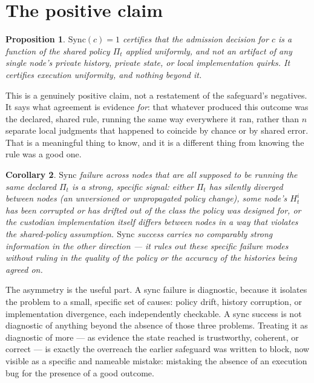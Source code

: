 \documentclass[11pt,openany]{book}
\newtheorem{proposition}{Proposition}[chapter]
\newtheorem{corollary}[proposition]{Corollary}
\begin{document}
\section{The positive claim}

\begin{proposition}
$\mathrm{Sync}(c) = 1$ certifies that the admission decision for $c$ is a function of the shared policy $\Pi_t$ applied uniformly, and not an artifact of any single node's private history, private state, or local implementation quirks. It certifies execution uniformity, and nothing beyond it.
\end{proposition}

This is a genuinely positive claim, not a restatement of the safeguard's negatives. It says what agreement is evidence \emph{for}: that whatever produced this outcome was the declared, shared rule, running the same way everywhere it ran, rather than $n$ separate local judgments that happened to coincide by chance or by shared error. That is a meaningful thing to know, and it is a different thing from knowing the rule was a good one.

\begin{corollary}
$\mathrm{Sync}$ failure across nodes that are all supposed to be running the same declared $\Pi_t$ is a strong, specific signal: either $\Pi_t$ has silently diverged between nodes (an unversioned or unpropagated policy change), some node's $H_t^i$ has been corrupted or has drifted out of the class the policy was designed for, or the custodian implementation itself differs between nodes in a way that violates the shared-policy assumption. $\mathrm{Sync}$ success carries no comparably strong information in the other direction — it rules out these specific failure modes without ruling in the quality of the policy or the accuracy of the histories being agreed on.
\end{corollary}

The asymmetry is the useful part. A sync failure is diagnostic, because it isolates the problem to a small, specific set of causes: policy drift, history corruption, or implementation divergence, each independently checkable. A sync success is not diagnostic of anything beyond the absence of those three problems. Treating it as diagnostic of more — as evidence the state reached is trustworthy, coherent, or correct — is exactly the overreach the earlier safeguard was written to block, now visible as a specific and nameable mistake: mistaking the absence of an execution bug for the presence of a good outcome.
\end{document}
